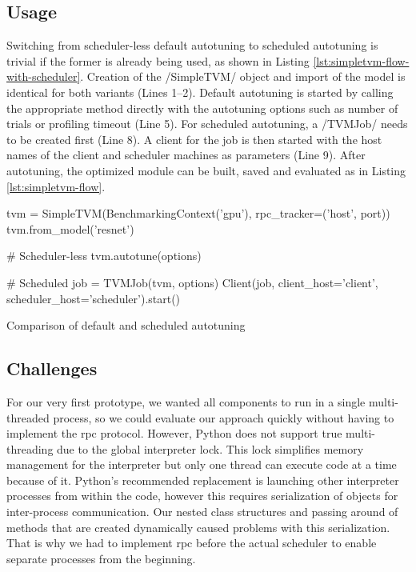 \subsection{Usage}
Switching from scheduler-less default autotuning to scheduled autotuning is trivial if the former is already being used, as shown in Listing \ref{lst:simpletvm-flow-with-scheduler}. Creation of the \pythoninline/SimpleTVM/ object and import of the model is identical for both variants (Lines 1--2). Default autotuning is started by calling the appropriate method directly with the autotuning options such as number of trials or profiling timeout (Line 5). For scheduled autotuning, a \pythoninline/TVMJob/ needs to be created first (Line 8). A client for the job is then started with the host names of the client and scheduler machines as parameters (Line 9). After autotuning, the optimized module can be built, saved and evaluated as in Listing \ref{lst:simpletvm-flow}.
\begin{listing}[h]
\begin{pythoncode}
tvm = SimpleTVM(BenchmarkingContext('gpu'), rpc_tracker=('host', port))
tvm.from_model('resnet')

# Scheduler-less
tvm.autotune(options)

# Scheduled
job = TVMJob(tvm, options)
Client(job, client_host='client', scheduler_host='scheduler').start()
\end{pythoncode}
\unskip
\caption{Comparison of default and scheduled autotuning}
\label{lst:simpletvm-flow-with-scheduler}
\end{listing}

\subsection{Challenges}
For our very first prototype, we wanted all components to run in a single multi-threaded process, so we could evaluate our approach quickly without having to implement the \gls{rpc} protocol. However, Python does not support true multi-threading due to the global interpreter lock. This lock simplifies memory management for the interpreter but only one thread can execute code at a time because of it. Python's recommended replacement is launching other interpreter processes from within the code, however this requires serialization of objects for inter-process communication. Our nested class structures and passing around of methods that are created dynamically caused problems with this serialization. That is why we had to implement \gls{rpc} before the actual scheduler to enable separate processes from the beginning.

